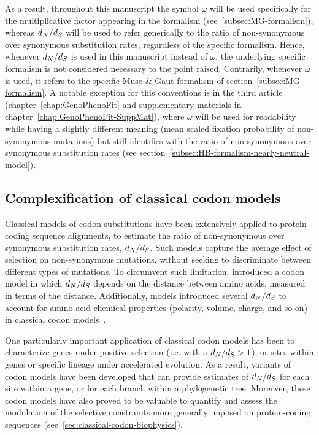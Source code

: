 As a result, throughout this manuscript the symbol $\omega$ will be used specifically for the multiplicative factor appearing in the \citet{Muse1994} formalism (see~\ref{subsec:MG-formalism}), whereas $d_N / d_S$ will be used to refer generically to the ratio of non-synonymous over synonymous substitution rates, regardless of the specific formalism.
Hence, whenever $d_N / d_S$ is used in this manuscript instead of $\omega$, the underlying specific formalism is not considered necessary to the point raised.
Contrarily, whenever $\omega$ is used, it refers to the specific Muse \& Gaut formalism of section~\ref{subsec:MG-formalism}.
A notable exception for this conventions is in the third article (chapter~\ref{chap:GenoPhenoFit} and supplementary materials in chapter~\ref{chap:GenoPhenoFit-SuppMat}), where $\omega$ will be used for readability while having a slightly different meaning (mean scaled fixation probability of non-synonymous mutations) but still identifies with the ratio of non-synonymous over synonymous substitution rates (see section~\ref{subsec:HB-formalism-nearly-neutral-model}).

\subsection{Complexification of classical codon models}
\label{subsec:classical-codon-models-complexification}

Classical models of codon substitutions have been extensively applied to protein-coding sequence alignments, to estimate the ratio of non-synonymous over synonymous substitution rates, $d_N / d_S$.
Such models capture the average effect of selection on non-synonymous mutations, without seeking to discriminate between different types of mutations.
To circumvent such limitation, \citet{Yang1998a} introduced a codon model in which $d_N / d_S$ depends on the distance between amino acids, measured in terms of the \citet{Grantham1974} distance.
Additionally, models introduced several $d_N / d_S$ to account for amino-acid chemical properties (polarity, volume, charge, and so on) in classical codon models~\citep{Dutheil2008}.

One particularly important application of classical codon models has been to characterize genes under positive selection (i.e. with a $d_N / d_S > 1$), or sites within genes or specific lineage under accelerated evolution.
As a result, variants of codon models have been developed that can provide estimates of $d_N / d_S$ for each site within a gene, or for each branch within a phylogenetic tree.
Moreover, these codon models have also proved to be valuable to quantify and assess the modulation of the selective constraints more generally imposed on protein-coding sequences (see~\ref{sec:classical-codon-biophysics}).

